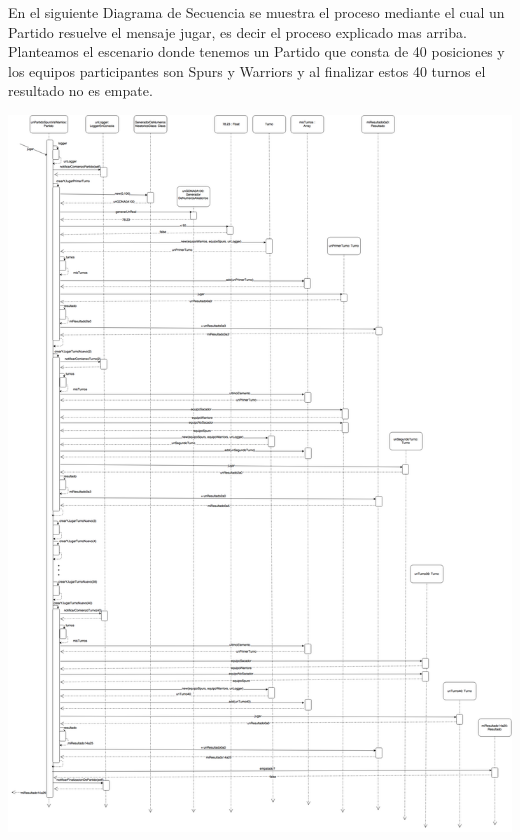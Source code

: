 En el siguiente Diagrama de Secuencia se muestra el proceso mediante el cual un Partido resuelve el mensaje jugar, es decir el proceso explicado mas arriba. Planteamos el escenario donde tenemos un Partido que consta de 40 posiciones y los equipos participantes son Spurs y Warriors y al finalizar estos 40 turnos el resultado no es empate.

\begin{center}
  \includegraphics[scale=0.24]{imagenes/partido-jugar-secuencia.png}
\end{center}

